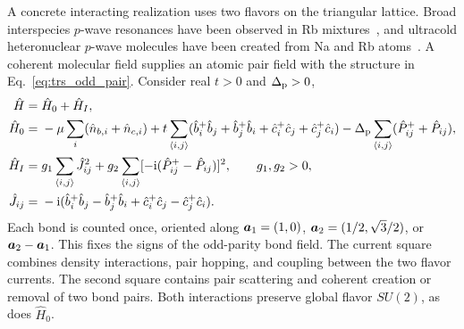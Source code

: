 A concrete interacting realization uses two flavors on the triangular lattice. Broad interspecies $p$-wave resonances have been observed in Rb mixtures~\cite{dongCuiShen2016pwave}, and ultracold heteronuclear $p$-wave molecules have been created from Na and Rb atoms~\cite{jiaGuoHuangWang2026pwave}. A coherent molecular field supplies an atomic pair field with the structure in Eq.~\eqref{eq:trs_odd_pair}. Consider real $t>0$ and $\Delta_{\rm p}>0$,
\begin{align}
    \hat H={}&\hat H_0+\hat H_I,
    \label{eq:trs_three_plus_model}\\
    \hat H_0={}&-\mu\sum_i(\hat n_{b,i}+\hat n_{c,i})
      +t\sum_{\langle i,j\rangle}
       (\hat b_i^+\hat b_j+\hat b_j^+\hat b_i
        +\hat c_i^+\hat c_j+\hat c_j^+\hat c_i)
      -\Delta_{\rm p}\sum_{\langle i,j\rangle}(\hat P_{ij}^++\hat P_{ij}),
    \label{eq:trs_three_plus_model_H0}\\
    \hat H_I={}&g_1\sum_{\langle i,j\rangle}\hat J_{ij}^2
       +g_2\sum_{\langle i,j\rangle}
          [-\mathrm{i}(\hat P_{ij}^+-\hat P_{ij})]^2,
    \qquad g_1,g_2>0,
    \label{eq:trs_three_plus_model_HI}\\
    \hat J_{ij}={}&-\mathrm{i}(\hat b_i^+\hat b_j-\hat b_j^+\hat b_i
                       +\hat c_i^+\hat c_j-\hat c_j^+\hat c_i).
    \label{eq:trs_three_plus_total_current}
\end{align}
Each bond is counted once, oriented along $\bm{a}_1=(1,0)$, $\bm{a}_2=(1/2,\sqrt3/2)$, or $\bm{a}_2-\bm{a}_1$. This fixes the signs of the odd-parity bond field. The current square combines density interactions, pair hopping, and coupling between the two flavor currents. The second square contains pair scattering and coherent creation or removal of two bond pairs. Both interactions preserve global flavor $SU(2)$, as does $\hat H_0$.

